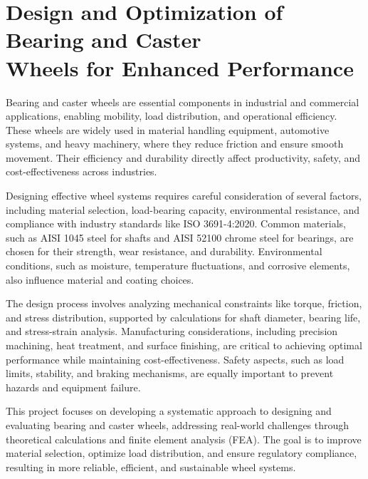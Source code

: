 \documentclass[../../main]{subfiles}
\begin{document}
\section[Bearing and Caster Wheel Design]{Design and Optimization of Bearing and Caster\\ Wheels for Enhanced Performance}

Bearing and caster wheels are essential components in industrial and commercial applications, enabling mobility, load distribution, and operational efficiency. These wheels are widely used in material handling equipment, automotive systems, and heavy machinery, where they reduce friction and ensure smooth movement. Their efficiency and durability directly affect productivity, safety, and cost-effectiveness across industries.

Designing effective wheel systems requires careful consideration of several factors, including material selection, load-bearing capacity, environmental resistance, and compliance with industry standards like ISO 3691-4:2020. Common materials, such as AISI 1045 steel for shafts and AISI 52100 chrome steel for bearings, are chosen for their strength, wear resistance, and durability. Environmental conditions, such as moisture, temperature fluctuations, and corrosive elements, also influence material and coating choices.

The design process involves analyzing mechanical constraints like torque, friction, and stress distribution, supported by calculations for shaft diameter, bearing life, and stress-strain analysis. Manufacturing considerations, including precision machining, heat treatment, and surface finishing, are critical to achieving optimal performance while maintaining cost-effectiveness. Safety aspects, such as load limits, stability, and braking mechanisms, are equally important to prevent hazards and equipment failure.

This project focuses on developing a systematic approach to designing and evaluating bearing and caster wheels, addressing real-world challenges through theoretical calculations and finite element analysis (FEA). The goal is to improve material selection, optimize load distribution, and ensure regulatory compliance, resulting in more reliable, efficient, and sustainable wheel systems.

\end{document}
